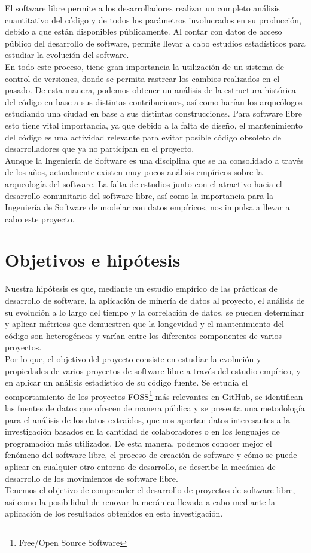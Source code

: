 \documentclass[a4paper, 12pt]{book}
\begin{document}
El software libre permite a los desarrolladores realizar un completo análisis cuantitativo del
código y de todos los parámetros involucrados en su producción, debido a que están disponibles públicamente.
Al contar con datos de acceso público del desarrollo de software, permite llevar a cabo estudios estadísticos
para estudiar la evolución del software.
\\En todo este proceso, tiene gran importancia la utilización de un sistema de control de versiones, donde se permita
rastrear los cambios realizados en el pasado. De esta manera, podemos obtener un análisis de la estructura histórica
del código en base a sus distintas contribuciones, así como harían los arqueólogos estudiando una ciudad en base a sus
distintas construcciones.
Para software libre esto tiene vital importancia, ya que debido a la falta de diseño, el mantenimiento del código
es una actividad relevante para evitar posible código obsoleto de desarrolladores que ya no participan en el proyecto.
\\Aunque la Ingeniería de Software es una disciplina que se ha consolidado a través de los años, actualmente
existen muy pocos análisis empíricos sobre la arqueología del software. La falta de estudios junto con el atractivo hacia el
desarrollo comunitario del software libre, así como la importancia para la Ingeniería de Software de modelar con datos empíricos,
nos impulsa a llevar a cabo este proyecto.

\section{Objetivos e hipótesis}
\label{sec:objetivos}

Nuestra hipótesis es que, mediante un estudio empírico de las prácticas de desarrollo de software, la aplicación de minería de datos
al proyecto, el análisis de su evolución a lo largo del tiempo y la correlación de datos, se pueden determinar y aplicar métricas
que demuestren que la longevidad y el mantenimiento del código son heterogéneos y varían entre los diferentes componentes de varios proyectos.
\\Por lo que, el objetivo del proyecto consiste en estudiar la evolución y propiedades de varios proyectos de software libre a través del estudio
empírico, y en aplicar un análisis estadístico de su código fuente.
Se estudia el comportamiento de los proyectos FOSS\footnote{Free/Open Source Software}  más relevantes en GitHub, se identifican las fuentes de datos que ofrecen de manera pública y se presenta
una metodología para el análisis de los datos extraidos, que nos aportan datos interesantes a la investigación basados en la cantidad de colaboradores
o en los lenguajes de programación más utilizados.
De esta manera, podemos conocer mejor el fenómeno del software libre, el proceso de creación de software y cómo se puede aplicar en cualquier
otro entorno de desarrollo, se describe la mecánica de desarrollo de los movimientos de software libre.
\\Tenemos el objetivo de comprender el desarrollo de proyectos de software libre, así como la posibilidad de renovar la mecánica llevada a cabo mediante la
aplicación de los resultados obtenidos en esta investigación.
\end{document}
